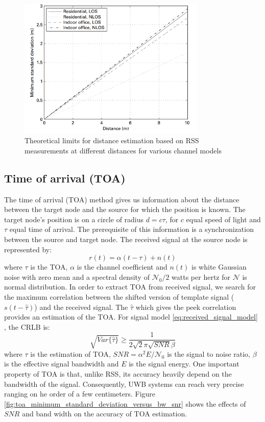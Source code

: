 \documentclass[../../main.tex]{subfiles}
\begin{document}
\begin{figure}[htbp]
    \centering
    \includegraphics[width=0.8\textwidth]{limits_for_distance_estimation_based_on_rss_measurements}
    \caption{Theoretical limits for distance estimation based on RSS measurements at different distances for various channel models}
    \label{fig:limits_for_distance_estimation_based_on_rss_measurements}
\end{figure}

\subsection{Time of arrival (TOA)}

The time of arrival (TOA) method gives us information about the distance between the target node and the source for which the position is known. The target node's position is on a circle of radius $d=c\tau$, for $c$ equal speed of light and $\tau$ equal time of arrival. The prerequisite of this information is a synchronization between the source and target node. The received signal at the source node is represented by:
\begin{equation}
    r(t) = \alpha(t-\tau) + n(t)
\end{equation}
where $\tau$ is the TOA, $\alpha$ is the channel coefficient and $n(t)$ is white Gaussian noise with zero mean and a spectral density of $\mathcal{N}_0/2$ watts per hertz for $\mathcal{N}$ is normal distribution. In order to extract TOA from received signal, we search for the maximum correlation between the shifted version of template signal ($s(t-\hat{\tau})$) and the received signal. The $\hat{\tau}$ which gives the peek correlation provides an estimation of the TOA. For signal model \ref{eq:received_signal_model} , the CRLB is:
\begin{equation}
    \sqrt{Var\{\hat{\tau}\}} \geq \frac{1}{2\sqrt{2}\pi\sqrt{SNR}\beta}
\end{equation}
where $\tau$ is the estimation of TOA, $SNR = \alpha^2 E / \mathcal{N}_0$ is the signal to noise ratio, $\beta$ is the effective signal bandwidth and $E$ is the signal energy. One important property of TOA is that, unlike RSS, its accuracy heavily depend on the bandwidth of the signal. Consequently, UWB systems can reach very precise ranging on he order of a few centimeters. Figure \ref{fig:toa_minimum_standard_deviation_versus_bw_snr} shows the effects of $SNR$ and band width on the accuracy of TOA estimation.
\end{document}
